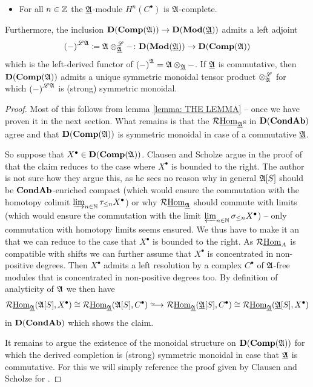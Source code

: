 \begin{theorem}
\begin{enumerate}
\begin{itemize}
			\item
			For all $n\in{\mathbb{Z}}$ the ${\underline{{\mathfrak{A}}}}$-module $H^n(C^\bullet)$ is ${\mathfrak{A}}$-complete.
		\end{itemize}
		Furthermore, the inclusion ${{\mathbf{D}}({{\mathbf{Comp}}({\mathfrak{A}})})} \to {{\mathbf{D}}({{\mathbf{Mod}}({\underline{{\mathfrak{A}}}})})}$ admits a left adjoint
			$$\derivedCompletion{-}{\preAnaRing{A}}\ldef \derivedCompletionAsTensor{\preAnaRing{A}}{\underlying{A}}{-}\colon \derived{\mod{\underlying{A}}}\to\derived{\pCompleteMod{A}}$$
		which is the left-derived functor of $\completion{-}{\preAnaRing{A}} = \completionAsTensor{\preAnaRing{A}}{\underlying{A}}{-}$. If ${\underline{{\mathfrak{A}}}}$ is commutative, then ${{\mathbf{D}}({{\mathbf{Comp}}({\mathfrak{A}})})}$ admits a unique symmetric monoidal tensor product $\otimes^{\mathscr{L}}_{\mathfrak{A}}$ for which $\derivedCompletion{-}{\preAnaRing{A}}$ is (strong) symmetric monoidal.
	\end{enumerate}
\end{theorem}
\begin{proof}
	Most of this follows from lemma \ref{lemma: THE LEMMA} -- once we have proven it in the next section. What remains is that the $\mathcal{R}{\underline{\operatorname{Hom}}}_{\underline{{\mathfrak{A}}}}$s in ${{\mathbf{D}}({{{\mathbf{Cond}}}{{\mathbf{Ab}}}})}$ agree and that ${{\mathbf{D}}({{\mathbf{Comp}}({\mathfrak{A}})})}$ is symmetric monoidal in case of a commutative ${\underline{{\mathfrak{A}}}}$.
	
	So suppose that $X^\bullet \in {{\mathbf{D}}({{\mathbf{Comp}}({\mathfrak{A}})})}$.
	Clausen and Scholze argue in the proof of \cite[Prop. 7.5, p.46]{condenseddotpdf} that the claim reduces to the case where $X^\bullet$ is bounded to the right. The author is not sure how they argue this, as he sees no reason why in general ${{{\mathfrak{A}}[S]}}$ should be ${{{\mathbf{Cond}}}{{\mathbf{Ab}}}}$-enriched compact (which would ensure the commutation with the homotopy colimit $\varinjlim_{n\in {\mathbb{N}}} {\tau_{\le n}}X^\bullet$) or why $\mathcal{R}{\underline{\operatorname{Hom}}}_{\underline{{\mathfrak{A}}}}$ should commute with limits (which would ensure the commutation with the limit $\varprojlim_{n\in {\mathbb{N}}} {\sigma_{\le n}}X^\bullet$) -- only commutation with homotopy limits seems ensured. We thus have to make it an \assumptionPreWord that we can reduce to the case that $X^\bullet$ is bounded to the right. As $\mathcal{R}{\underline{\operatorname{Hom}}}_A$ is compatible with shifts we can further assume that $X^\bullet$ is concentrated in non-positive degrees. Then $X^\bullet$ admits a left resolution by a complex $C^\bullet$ of ${\mathfrak{A}}$-free modules that is concentrated in non-positive degrees too. By definition of analyticity of ${\mathfrak{A}}$ we then have
		$$\eRHom_{\underlying{A}}(\pfree{A}{S}, X^\bullet) \cong \eRHom_\underlying{A}(\pfree{A}{S}, C^\bullet) \isorightarrow \eRHom_\underlying{A}(\ufree{A}{S}, C^\bullet) \cong \eRHom_{\underlying{A}}(\ufree{A}{S}, X^\bullet)$$
	in ${{\mathbf{D}}({{{\mathbf{Cond}}}{{\mathbf{Ab}}}})}$ which shows the claim.
	
	It remains to argue the existence of the monoidal structure on ${{\mathbf{D}}({{\mathbf{Comp}}({\mathfrak{A}})})}$ for which the derived completion is (strong) symmetric monoidal in case that ${\underline{{\mathfrak{A}}}}$ is commutative. For this we will simply reference the proof given by Clausen and Scholze for \cite[Prop. 7.5]{condenseddotpdf}.
\end{proof}

